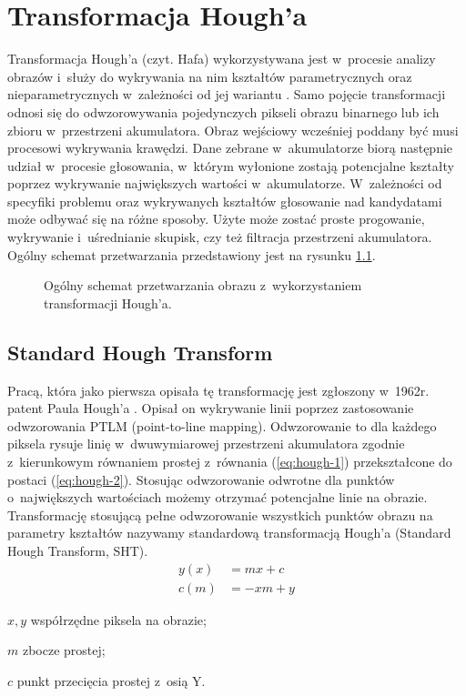 \chapter{Transformacja Hough'a}
\label{sec:hough}

Transformacja Hough'a (czyt. Hafa) wykorzystywana jest w~procesie analizy obrazów i~służy do wykrywania na nim kształtów parametrycznych oraz nieparametrycznych w~zależności od jej wariantu \cite{mukhopadhyay2015survey}. Samo pojęcie transformacji odnosi się do odwzorowywania pojedynczych pikseli obrazu binarnego lub ich zbioru w~przestrzeni akumulatora. Obraz wejściowy wcześniej poddany być musi procesowi wykrywania krawędzi. Dane zebrane w~akumulatorze biorą następnie udział w~procesie głosowania, w~którym wyłonione zostają potencjalne kształty poprzez wykrywanie największych wartości w~akumulatorze. W~zależności od specyfiki problemu oraz wykrywanych kształtów głosowanie nad kandydatami może odbywać się na różne sposoby. Użyte może zostać proste progowanie, wykrywanie i~uśrednianie skupisk, czy też filtracja przestrzeni akumulatora. Ogólny schemat przetwarzania przedstawiony jest na rysunku \ref{fig:hough}.

\begin{figure}
    \centering
    
    \caption{Ogólny schemat przetwarzania obrazu z~wykorzystaniem transformacji Hough'a.}
    \label{fig:hough}
\end{figure}

\section{Standard Hough Transform}

Pracą, która jako pierwsza opisała tę transformację jest zgłoszony w~1962r. patent Paula Hough'a \cite{hough1962method}. Opisał on wykrywanie linii poprzez zastosowanie odwzorowania PTLM (point-to-line mapping). Odwzorowanie to dla każdego piksela rysuje linię w~dwuwymiarowej przestrzeni akumulatora zgodnie z~kierunkowym równaniem prostej z~równania (\ref{eq:hough-1}) przekształcone do postaci (\ref{eq:hough-2}). Stosując odwzorowanie odwrotne dla punktów o~największych wartościach możemy otrzymać potencjalne linie na obrazie. Transformację stosującą pełne odwzorowanie wszystkich punktów obrazu na parametry kształtów nazywamy standardową transformacją Hough'a (Standard Hough Transform, SHT).
\begin{align}
    y(x) &= mx+c \label{eq:hough-1}\\
    c(m) &= -xm+y \label{eq:hough-2}
\end{align}
\begin{eqexpl}
    \item{$x, y$} współrzędne piksela na obrazie;
    \item{$m$} zbocze prostej;
    \item{$c$} punkt przecięcia prostej z~osią Y.
\end{eqexpl}

